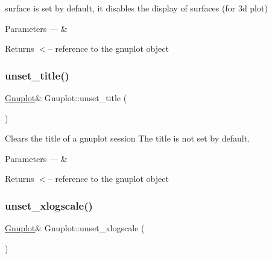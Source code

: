 surface is set by default, it disables the display of surfaces (for 3d plot)


\begin{DoxyParams}{Parameters}
{\em ---} & \\
\hline
\end{DoxyParams}
\begin{DoxyReturn}{Returns}
$<$-- reference to the gnuplot object 
\end{DoxyReturn}
\mbox{\label{class_gnuplot_aca0aeb1dc0ac8d7e68ba6a15a977be28}} 
\subsubsection{\texorpdfstring{unset\+\_\+title()}{unset\_title()}}
{\footnotesize\ttfamily \hyperlink{class_gnuplot}{Gnuplot}\& Gnuplot\+::unset\+\_\+title (\begin{DoxyParamCaption}{ }\end{DoxyParamCaption})\hspace{0.3cm}{\ttfamily [inline]}}



Clears the title of a gnuplot session The title is not set by default. 


\begin{DoxyParams}{Parameters}
{\em ---} & \\
\hline
\end{DoxyParams}
\begin{DoxyReturn}{Returns}
$<$-- reference to the gnuplot object 
\end{DoxyReturn}
\mbox{\label{class_gnuplot_a7b178184260f1498cd0c11a197ea0ac2}} 
\subsubsection{\texorpdfstring{unset\+\_\+xlogscale()}{unset\_xlogscale()}}
{\footnotesize\ttfamily \hyperlink{class_gnuplot}{Gnuplot}\& Gnuplot\+::unset\+\_\+xlogscale (\begin{DoxyParamCaption}{ }\end{DoxyParamCaption})\hspace{0.3cm}{\ttfamily [inline]}}

